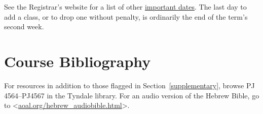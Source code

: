 \documentclass[titlepage]{article}
\begin{document}

See the Registrar's website for a list of other
\href{http://www.tyndale.ca/registrar/important-dates}{important dates}.
The last day to add a class, or to drop one without penalty, is
ordinarily the end of the term's second week.

\section{Course Bibliography}
\label{bibliography}

For resources in addition to those flagged in Section~\ref{supplementary},
browse PJ 4564--PJ4567 in the Tyndale library. For an audio version of the
Hebrew Bible, go to <\href{http://aoal.org/hebrew_audiobible.html}{aoal.org/hebrew\_audiobible.html}>.
\end{document}
